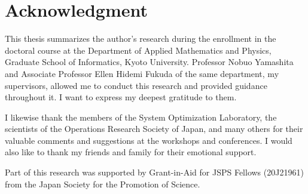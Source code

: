 \documentclass[../main]{subfiles}
\begin{document}
\chapter*{Acknowledgment}
This thesis summarizes the author's research during the enrollment in the doctoral course at the Department of Applied Mathematics and Physics, Graduate School of Informatics, Kyoto University. Professor Nobuo Yamashita and Associate Professor Ellen Hidemi Fukuda of the same department, my supervisors, allowed me to conduct this research and provided guidance throughout it. I want to express my deepest gratitude to them. 

I likewise thank the members of the System Optimization Laboratory, the scientists of the Operations Research Society of Japan, and many others for their valuable comments and suggestions at the workshops and conferences. I would also like to thank my friends and family for their emotional support.

Part of this research was supported by Grant-in-Aid for JSPS Fellows (20J21961) from the Japan Society for the Promotion of Science.
\end{document}

